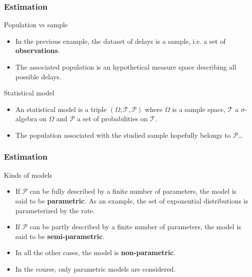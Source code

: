 \documentclass[main.tex]{subfiles}
\begin{document}
\begin{frame}
    \frametitle{Estimation}
\begin{block}{Population vs sample}
    \begin{itemize}
        \item<+-> In the previous example, the dataset of delays is a sample, i.e. a set of \textbf{observations}.
        \item<+-> The associated population is an hypothetical measure space describing all possible delays.
    \end{itemize}
\end{block}
\begin{block}{Statistical model}
   \begin{itemize}
    \item<+-> An statistical model is a triple $\left( \Omega, \mathcal{T}, \mathcal{P} \right)$ where $\Omega$ is a sample space,
    $\mathcal{T}$ a $\sigma$-algebra on $\Omega$ and $\mathcal{P}$ a set of probabilities on $\mathcal{T}.$
    \item<+-> The population associated with the studied sample hopefully belongs to $\mathcal{P}$\dots
   \end{itemize} 
\end{block}
\end{frame}
\begin{frame}
    \frametitle{Estimation}
\begin{block}{Kinds of models}
\begin{itemize}
    \item<+-> If $\mathcal{P}$ can be fully described by a finite number of parameters, the model is said to be \textbf{parametric}. As an example, 
    the set of exponential distributions is parameterized by the rate.
    \item<+-> If $\mathcal{P}$ can be partly described by a finite number of parameters, the model is said to be \textbf{semi-parametric}.
    \item<+-> In all the other cases, the model is \textbf{non-parametric}.
    \item<+-> In the course, only parametric models are considered. 
\end{itemize}    
\end{block}
 
\end{frame}
\end{document}
